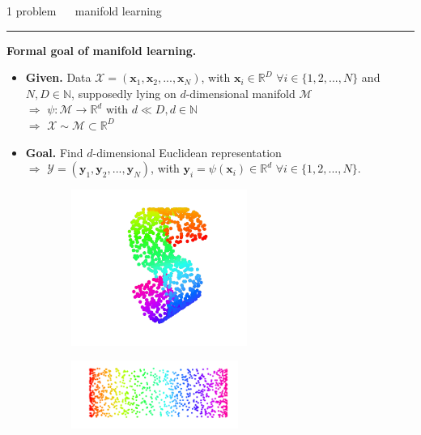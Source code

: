\documentclass[11pt, compress, t, notes = noshow, xcolor = table, 
aspectratio = 1610]{beamer}
\newcommand{\highlight}[1]{\textcolor{highlightcol}{\textbf{#1}}}
\newcommand{\arritem}{\item[\highlight{$\rightarrow$}]}
\newcommand{\mani}{\mathcal{M}}
\newcommand{\N}{\mathbb{N}}
\newcommand{\R}{\mathbb{R}}
\newcommand{\RD}{\mathbb{R}^D}
\newcommand{\Rd}{\mathbb{R}^d}
\newcommand{\setN}{\{1, 2, ..., N\}}
\newcommand{\X}{\mathcal{X}}
\newcommand{\x}{\bm{x}}
\newcommand{\Y}{\mathcal{Y}}
\newcommand{\y}{\bm{y}}
\begin{document}
\LARGE
\begin{frame}{\textcolor{gray!90}{1 problem} ~~ manifold learning}
\normalsize
\vspace{-0.5cm}
\noindent \textcolor{gray!90}{\rule{\textwidth}{1pt}}
\smallskip

\textbf{Formal goal of manifold learning.}
\medskip
\begin{itemize}
  \arritem \textbf{Given.} Data $\X = (\x_1, \x_2, ..., \x_N)$, with $\x_i \in 
  \RD$ $\forall i \in \setN$ and $N, D \in \N$, supposedly lying on 
  $d$-dimensional manifold $\mani$ \\
  $\Rightarrow$ $\psi: \mani \rightarrow \Rd$ with $d \ll D, d \in \N$ \\
  $\Rightarrow$ $\X \sim \mani \subset \RD$ 
  \medskip
  \arritem \textbf{Goal.} Find $d$-dimensional Euclidean representation \\
  $\Rightarrow$ $\Y = (\y_1, \y_2, ..., \y_N)$, with 
  $\y_i = \psi(\x_i) \in \R^d$ $\forall i \in \setN$.
\end{itemize}

\vfill

\begin{figure}[H]
 \begin{subfigure}[c]{0.2\textwidth}
  \centering
   \includegraphics[trim = 70 30 70 30, clip, %
      width = 0.63\textwidth]{figures/s-curve}
 \end{subfigure}
 \hfill
 \begin{subfigure}[c]{0.7\textwidth}
   \includegraphics[trim = 80 20 0 0, clip, %
      width = 0.6\textwidth]{figures/s-curve-undone}
 \end{subfigure}
\end{figure}

\end{frame}
\end{document}
